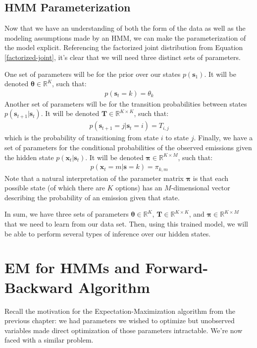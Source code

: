 \subsection{HMM Parameterization}
Now that we have an understanding of both the form of the data as well as the modeling assumptions made by an HMM, we can make the parameterization of the model explicit. Referencing the factorized joint distribution from Equation \ref{factorized-joint}, it's clear that we will need three distinct sets of parameters.

One set of parameters will be for the prior over our states $p(\textbf{s}_1)$. It will be denoted $\boldsymbol{\theta} \in \mathbb{R}^{K}$, such that:
\begin{align*}
	p(\textbf{s}_t = k) = \theta_k
\end{align*}
Another set of parameters will be for the transition probabilities between states $p(\textbf{s}_{t+1} | \textbf{s}_t)$. It will be denoted $\textbf{T} \in \mathbb{R}^{K \times K}$, such that:
\begin{align*}
	p(\textbf{s}_{t+1} = j | \textbf{s}_t = i) = T_{i,j}
\end{align*}
which is the probability of transitioning from state $i$ to state $j$. Finally, we have a set of parameters for the conditional probabilities of the observed emissions given the hidden state $p(\textbf{x}_t | \textbf{s}_t)$. It will be denoted $\boldsymbol{\pi} \in \mathbb{R}^{K \times M}$, such that:
\begin{align*}
	p(\textbf{x}_t = m | \textbf{s} = k) = \pi_{k, m}
\end{align*}
Note that a natural interpretation of the parameter matrix $\boldsymbol{\pi}$ is that each possible state (of which there are $K$ options) has an $M$-dimensional vector describing the probability of an emission given that state.

In sum, we have three sets of parameters $\boldsymbol{\theta} \in \mathbb{R}^{K}$, $\textbf{T} \in \mathbb{R}^{K \times K}$, and $\boldsymbol{\pi} \in \mathbb{R}^{K \times M}$ that we need to learn from our data set. Then, using this trained model, we will be able to perform several types of inference over our hidden states.

\section{EM for HMMs and Forward-Backward Algorithm}
Recall the motivation for the Expectation-Maximization algorithm from the previous chapter: we had parameters we wished to optimize but unobserved variables made direct optimization of those parameters intractable. We're now faced with a similar problem.

